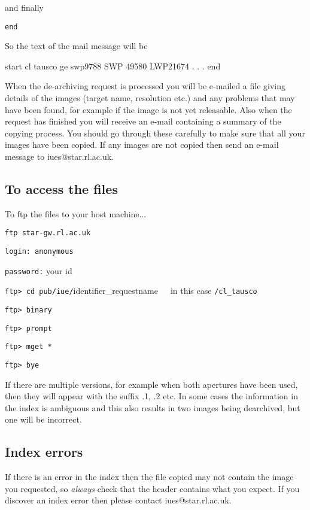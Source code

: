 \documentclass[11pt,twoside,nolof,noabs]{starlink}
\begin{document}
and finally

\texttt{end}

So the text of the mail message will be

\begin{terminalv}
start
cl
tausco
ge
swp9788
SWP 49580
LWP21674
.
.
.
end
\end{terminalv}

When the de-archiving request is processed you will be e-mailed a file giving
details of the images (target name, resolution etc.) and any problems that may
have been found, for example if the image is not yet releasable.
Also when the request has finished you will
receive an e-mail containing a summary of the copying process.
You should go through these carefully to make sure that all your images have
been copied. If any images are not copied then send an e-mail message to
iues@star.rl.ac.uk.

\subsection{To access the files}

To ftp the files to your host machine...

\texttt{ftp star-gw.rl.ac.uk}

\texttt{login: anonymous}

\texttt{password:} your id

\texttt{ftp> cd pub/iue/}identifier\_requestname~~~in this case \texttt{/cl\_tausco}

\texttt{ftp> binary}

\texttt{ftp> prompt}

\texttt{ftp> mget *}

\texttt{ftp> bye}

If there are multiple versions, for example when both apertures have been
used, then they will appear with the suffix .1, .2 etc.
In some cases the information in the index is ambiguous and this also
results in two images being dearchived, but one will be incorrect.

\subsection{Index errors}

If there is an error in the index then the file copied may not contain the
image you requested, so \textit{always\/} check that the header contains what you
expect.
If you discover an index error then please contact
iues@star.rl.ac.uk.
\end{document}
